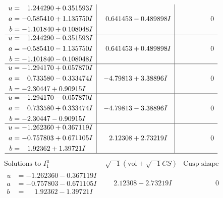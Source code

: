 \documentclass[1p]{elsarticle_modified}
\theoremstyle{definition}
\newcommand{\I}{\sqrt{-1}}
\begin{document}
$$\begin{array}{c|c|c}
\begin{aligned}
u &= \phantom{-}1.244290 + 0.351593 I \\
a &= -0.585410 + 1.135750 I \\
b &= -1.101840 + 0.108048 I\end{aligned}
 & \phantom{-}0.641453 - 0.489898 I & \phantom{-0.000000 } 0 \\ \hline\begin{aligned}
u &= \phantom{-}1.244290 - 0.351593 I \\
a &= -0.585410 - 1.135750 I \\
b &= -1.101840 - 0.108048 I\end{aligned}
 & \phantom{-}0.641453 + 0.489898 I & \phantom{-0.000000 } 0 \\ \hline\begin{aligned}
u &= -1.294170 + 0.057870 I \\
a &= \phantom{-}0.733580 - 0.333474 I \\
b &= -2.30447 + 0.90915 I\end{aligned}
 & -4.79813 + 3.38896 I & \phantom{-0.000000 } 0 \\ \hline\begin{aligned}
u &= -1.294170 - 0.057870 I \\
a &= \phantom{-}0.733580 + 0.333474 I \\
b &= -2.30447 - 0.90915 I\end{aligned}
 & -4.79813 - 3.38896 I & \phantom{-0.000000 } 0 \\ \hline\begin{aligned}
u &= -1.262360 + 0.367119 I \\
a &= -0.757803 + 0.671105 I \\
b &= \phantom{-}1.92362 + 1.39721 I\end{aligned}
 & \phantom{-}2.12308 + 2.73219 I & \phantom{-0.000000 } 0\\
 \hline 
 \end{array}$$\newpage$$\begin{array}{c|c|c}  
\text{Solutions to }I^u_{1}& \I (\text{vol} + \sqrt{-1}CS) & \text{Cusp shape}\\
 \hline 
\begin{aligned}
u &= -1.262360 - 0.367119 I \\
a &= -0.757803 - 0.671105 I \\
b &= \phantom{-}1.92362 - 1.39721 I\end{aligned}
 & \phantom{-}2.12308 - 2.73219 I & \phantom{-0.000000 } 0 \\ \hline\begin{aligned}

\end{aligned}
\end{array}$$
\end{document}
